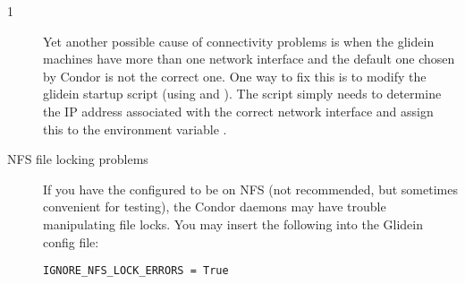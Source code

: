 \begin{ManPage}{\label{man-condor-glidein}}{1}
\begin{description}
Yet another possible cause of connectivity problems is when the glidein
machines have more than one network interface and the default one chosen
by Condor is not the correct one.  One way to fix this is to modify
the glidein startup script (using  and ).
The script simply needs to determine the IP address associated with
the correct network interface and assign this to the environment
variable .

\item[NFS file locking problems]  If you have the 
configured to be on NFS (not recommended, but sometimes convenient
for testing), the Condor daemons may have trouble manipulating file
locks.  You may insert the following into the Glidein config file:

\begin{verbatim}
IGNORE_NFS_LOCK_ERRORS = True
\end{verbatim}

\end{description}

\end{ManPage}
